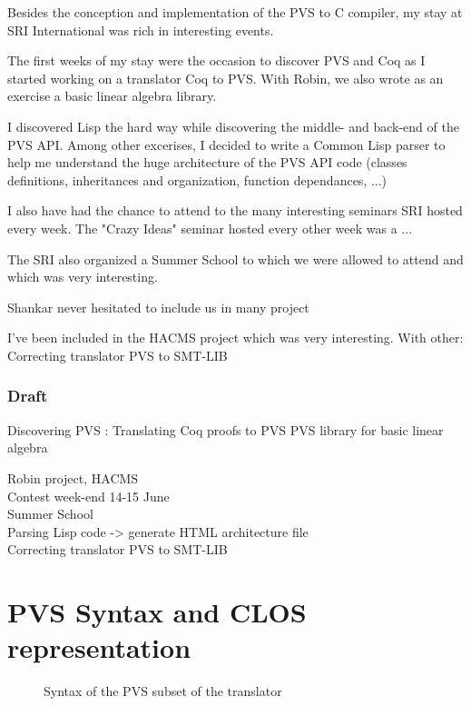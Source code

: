 \documentclass[12pt,a4paper]{article}
\begin{document}
Besides the conception and implementation of the PVS to C compiler, my stay at SRI International was rich in interesting events.

The first weeks of my stay were the occasion to discover PVS and Coq as I started working on a translator Coq to PVS. With Robin, we also wrote as an exercise a basic linear algebra library.

I discovered Lisp the hard way while discovering the middle- and back-end of the PVS API. Among other excerises, I decided to write a Common Lisp parser to help me understand the huge architecture of the PVS API code (classes definitions, inheritances and organization, function dependances, ...)

I also have had the chance to attend to the many interesting seminars SRI hosted every week. The "Crazy Ideas" seminar hosted every other week was a ...

The SRI also organized a Summer School to which we were allowed to attend and which was very interesting.

Shankar never hesitated to include us in many project

I've been included in the HACMS project which was very interesting.
With other:
Correcting translator PVS to SMT-LIB




\subsubsection*{Draft}
Discovering PVS :
Translating Coq proofs to PVS
PVS library for basic linear algebra

Robin project, HACMS \\
Contest week-end 14-15 June \\
Summer School \\
Parsing Lisp code -> generate HTML architecture file\\
Correcting translator PVS to SMT-LIB
\cite{pavol}




\printbibliography

\appendix

\newpage
\section{PVS Syntax and CLOS representation}

\begin{figure}[h]

\caption{Syntax of the PVS subset of the translator}
\label{fig:PVSsyntax}
\end{figure}
\end{document}
